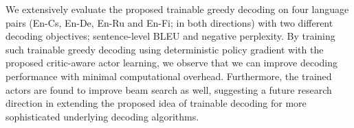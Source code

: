 We extensively evaluate the proposed trainable greedy decoding on four language pairs (En-Cs, En-De, En-Ru and En-Fi; in both directions) with two different decoding objectives; sentence-level BLEU and negative perplexity. By training such trainable greedy decoding using deterministic policy gradient with the proposed critic-aware actor learning, we observe that we can improve decoding performance with minimal computational overhead. Furthermore, the trained actors are found to improve beam search as well, suggesting a future research direction in extending the proposed idea of trainable decoding for more sophisticated underlying decoding algorithms.

%
%
%
